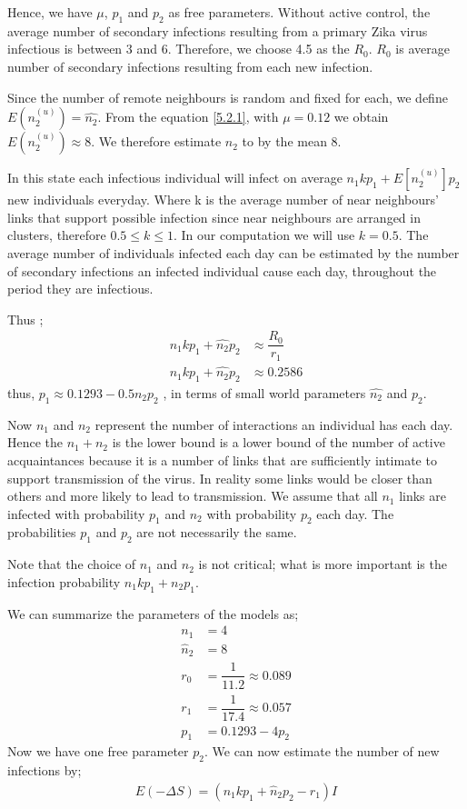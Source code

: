   Hence, we have $\mu$, $p_1$ and $p_2$  as free parameters. Without active control, the average number of secondary infections resulting from a primary  Zika  virus infectious is between 3 and 6. Therefore, we choose 4.5 as the $R_0$. $R_0$ is average number of secondary infections resulting from each new infection.
  
  Since the number of remote neighbours is random and fixed for each, we define $E (n^ {(u)} _2) = \widehat{n_2}$. From the equation \ref{5.2.1}, with $\mu = 0.12$ we obtain $E (n^ {(u)} _2) \approx 8$. We therefore estimate $n_2$ to by the mean $8$.
  
  In this state each infectious individual will infect on average $n_1kp_1 + E[n^{(u)}_2]p_2 $ new individuals everyday. Where k is the average number of near neighbours' links that support possible infection since 
  near neighbours are arranged in clusters, therefore $0.5 \leq k \leq 1$. In our computation we will use $k=0.5$.
    The average number  of individuals infected each day can be estimated by the number of secondary infections an infected individual cause each day, throughout the period they are infectious.

  Thus ;
\begin{align}
n_1k p_1 + \widehat{n_2} p_2 &\approx \dfrac{R_0}{r_1} 
\\ n_1k p_1 + \widehat{n_2} p_2 &\approx 0.2586 \label{eqn 5.32}
\end{align}
thus, 
$p_1 \approx   0.1293- 0.5 \widehat{n_2} p_2$ , in terms of small world parameters $\widehat{n_2}$ and $p_2$.

Now $n_1$ and $n_2$ represent the number of interactions an individual has each day. Hence the  $n_1 + n_2$ is the lower bound is a lower bound of the number of active acquaintances because it is a number of links that are sufficiently intimate to support transmission of the virus. In reality some links would be closer than others and more likely to lead to transmission. We assume that all $n_1$ links are infected with probability $p_1$ and $n_2$ with probability $p_2$ each day. The probabilities $p_1$ and $p_2$ are not necessarily  the same.

Note that the choice of $n_1$ and $n_2$ is not critical; what is more important is the infection probability $n_1kp_1 + n_2p_1$.

We can summarize the parameters of the models as;
\begin{align}
n_1 &= 4 \\
\widehat{n}_2 &= 8 \\
r_0 &= \dfrac{1}{11.2} \approx 0.089 \\
r_1 &= \dfrac{1}{17.4} \approx 0.057 \\
p_1 &= 0.1293 - 4 p_2 \label{eqn 5.1.7}
\end{align}
Now we have one free parameter $p_2$. We can now estimate the number of new infections by;
\begin{align}
E(- \Delta S) = (n_1 k p_1 + \widehat{n}_2    p_2 - r_1) I \label{5.18}
\end{align}

